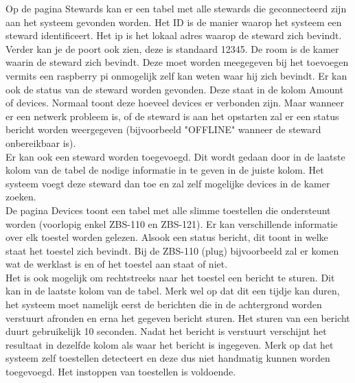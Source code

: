 \documentclass{article}
\begin{document}
Op de pagina Stewards kan er een tabel met alle stewards die geconnecteerd zijn aan het systeem gevonden worden. Het ID is de manier waarop het systeem een steward identificeert. Het ip is het lokaal adres waarop de steward zich bevindt. Verder kan je de poort ook zien, deze is standaard 12345. De room is de kamer waarin de steward zich bevindt. Deze moet worden meegegeven bij het toevoegen vermits een raspberry pi onmogelijk zelf kan weten waar hij zich bevindt. Er kan ook de status van de steward worden gevonden. Deze staat in de kolom Amount of devices. Normaal toont deze hoeveel devices er verbonden zijn. Maar wanneer er een netwerk probleem is, of de steward is aan het opstarten zal er een status bericht worden weergegeven (bijvoorbeeld "OFFLINE" wanneer de steward onbereikbaar is).\\
Er kan ook een steward worden toegevoegd. Dit wordt gedaan door in de laatste kolom van de tabel de nodige informatie in te geven in de juiste kolom. Het systeem voegt deze steward dan toe en zal zelf mogelijke devices in de kamer zoeken.\\

De pagina Devices toont een tabel met alle slimme toestellen die ondersteunt worden (voorlopig enkel ZBS-110 en ZBS-121). Er kan verschillende informatie over elk toestel worden gelezen. Alsook een status bericht, dit toont in welke staat het toestel zich bevindt. Bij de ZBS-110 (plug) bijvoorbeeld zal er komen wat de werklast is en of het toestel aan staat of niet. \\
Het is ook mogelijk om rechtstreeks naar het toestel een bericht te sturen. Dit kan in de laatste kolom van de tabel. Merk wel op dat dit een tijdje kan duren, het systeem moet namelijk eerst de berichten die in de achtergrond worden verstuurt afronden en erna het gegeven bericht sturen. Het sturen van een bericht duurt gebruikelijk 10 seconden. Nadat het bericht is verstuurt verschijnt het resultaat in dezelfde kolom als waar het bericht is ingegeven. Merk op dat het systeem zelf toestellen detecteert en deze dus niet handmatig kunnen worden toegevoegd. Het instoppen van toestellen is voldoende.\\
\end{document}
